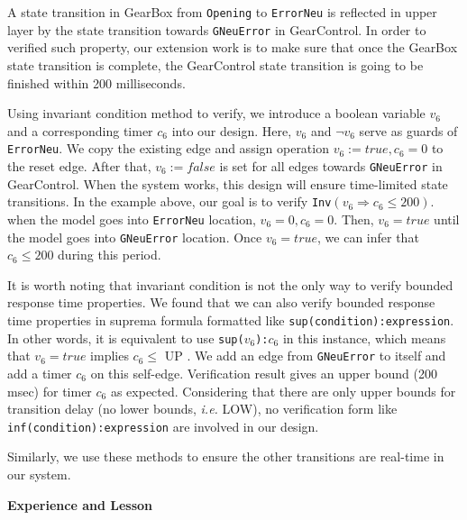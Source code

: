 \documentclass[a4paper]{article}
\begin{document}
\large{A state transition in \textsf{GearBox} from \texttt{Opening} to \texttt{ErrorNeu} is reflected in upper layer by the state transition towards \texttt{GNeuError} in \textsf{GearControl}. In order to verified such property, our extension work is to make sure that once the \textsf{GearBox} state transition is complete, the \textsf{GearControl} state transition is going to be finished within 200 milliseconds. 

Using invariant condition method to verify, we introduce a boolean variable $v_6$ and a corresponding timer $c_6$ into our design. Here, $v_6$ and $\lnot v_6$ serve as guards of \texttt{ErrorNeu}. We copy the existing edge and assign operation $v_6:=true, c_6=0$ to the reset edge. After that, $v_6:=false$ is set for all edges towards \texttt{GNeuError} in \textsf{GearControl}. When the system works, this design will ensure time-limited state transitions. In the example above, our goal is to verify \texttt{Inv}$(v_6\Rightarrow c_6 \le 200)$. when the model goes into \texttt{ErrorNeu} location, $v_6=0,c_6=0$. Then, $v_6=true$ until the model goes into \texttt{GNeuError} location. Once $v_6=true$, we can infer that $c_6\le 200$ during this period. 

It is worth noting that invariant condition is not the only way to verify bounded response time properties. We found that we can also verify bounded response time properties in suprema formula formatted like \texttt{sup(condition):expression}. In other words, it is equivalent to use \texttt{sup($v_6$):$c_6$} in this instance, which means that $v_6=true$ implies $c_6 \le$ \normalsize{UP} \large. We add an edge from \texttt{GNeuError} to itself and add a timer $c_6$ on this self-edge. Verification result gives an upper bound (200 msec) for timer $c_6$ as expected. Considering that there are only upper bounds for transition delay (no lower bounds, \textit{i.e. }\small{LOW}\large), no verification form like \texttt{inf(condition):expression} are involved in our design.

Similarly, we use these methods to ensure the other transitions are real-time in our system.}



\vspace{2mm}
\begin{center}
\large\textbf{Experience and Lesson} \\
\end{center}
\end{document}
